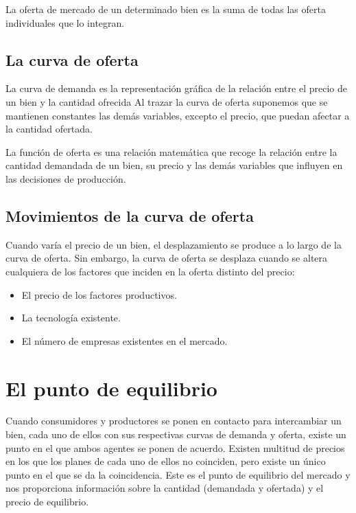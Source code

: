 \documentclass[
]{book}
\providecommand{\tightlist}{%
  \setlength{\itemsep}{0pt}\setlength{\parskip}{0pt}}
\begin{document}
La oferta de mercado de un determinado bien es la suma de todas las oferta individuales que lo integran.

\hypertarget{la-curva-de-oferta}{%
\subsection{La curva de oferta}\label{la-curva-de-oferta}}

La curva de demanda es la representación gráfica de la relación entre el precio de un bien y la cantidad ofrecida Al trazar la curva de oferta suponemos que se mantienen constantes las demás variables, excepto el precio, que puedan afectar a la cantidad ofertada.

La función de oferta es una relación matemática que recoge la relación entre la cantidad demandada de un bien, su precio y las demás variables que influyen en las decisiones de producción.

\hypertarget{movimientos-de-la-curva-de-oferta}{%
\subsection{Movimientos de la curva de oferta}\label{movimientos-de-la-curva-de-oferta}}

Cuando varía el precio de un bien, el desplazamiento se produce a lo largo de la curva de oferta. Sin embargo, la curva de oferta se desplaza cuando se altera cualquiera de los factores que inciden en la oferta distinto del precio:

\begin{itemize}
\tightlist
\item
  El precio de los factores productivos.
\item
  La tecnología existente.
\item
  El número de empresas existentes en el mercado.
\end{itemize}

\hypertarget{el-punto-de-equilibrio}{%
\section{El punto de equilibrio}\label{el-punto-de-equilibrio}}

Cuando consumidores y productores se ponen en contacto para intercambiar un bien, cada uno de ellos con sus respectivas curvas de demanda y oferta, existe un punto en el que ambos agentes se ponen de acuerdo. Existen multitud de precios en los que los planes de cada uno de ellos no coinciden, pero existe un único punto en el que se da la coincidencia. Este es el punto de equilibrio del mercado y nos proporciona información sobre la cantidad (demandada y ofertada) y el precio de equilibrio.
\end{document}
